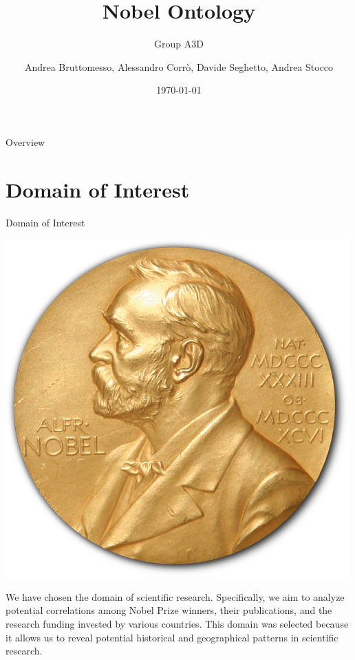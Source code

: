 \documentclass[aspectratio=169,xcolor=dvipsnames]{beamer}
\title{Nobel Ontology}
\subtitle{Group A3D}
\author{Andrea Bruttomesso, Alessandro Corr\`o, Davide Seghetto, Andrea Stocco}
\date{\today} %
\begin{document}
\begin{frame}
	\titlepage
\end{frame}

\begin{frame}{Overview}
	\tableofcontents
\end{frame}

\section{Domain of Interest}

\begin{frame}{Domain of Interest}
	\centering
	\begin{minipage}{0.3\textwidth}
		\centering
		\includegraphics[width=\textwidth]{nobel.png} %
	\end{minipage}%
	\hspace{3em}
	\begin{minipage}{0.4\textwidth}
		\centering
		We have chosen the domain of scientific research. Specifically, we aim to analyze potential correlations among Nobel Prize winners,
		their publications, and the research funding invested by various countries. This domain was selected because it allows us to reveal potential historical
		and geographical patterns in scientific research.
	\end{minipage}%
\end{frame}
\end{document}
